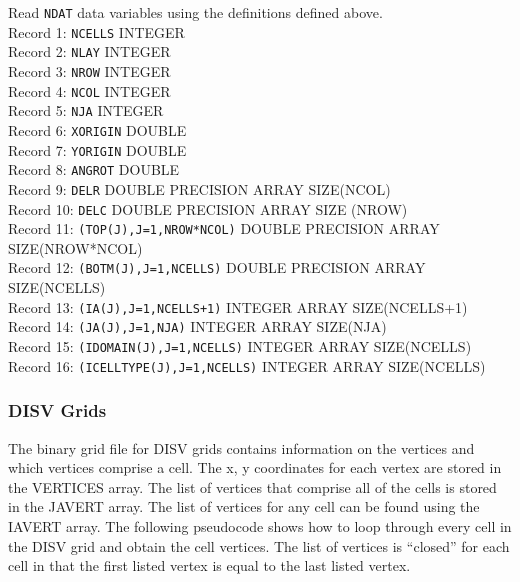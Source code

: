 \vspace{5mm}
\noindent Read \texttt{NDAT} data variables using the definitions defined above. \\
\noindent Record 1: \texttt{NCELLS} {\color{red} \footnotesize{INTEGER}} \\
\noindent Record 2: \texttt{NLAY} {\color{red} \footnotesize{INTEGER}} \\
\noindent Record 3: \texttt{NROW} {\color{red} \footnotesize{INTEGER}} \\
\noindent Record 4: \texttt{NCOL} {\color{red} \footnotesize{INTEGER}} \\
\noindent Record 5: \texttt{NJA} {\color{red} \footnotesize{INTEGER}} \\
\noindent Record 6: \texttt{XORIGIN} {\color{red} \footnotesize{DOUBLE}} \\
\noindent Record 7: \texttt{YORIGIN} {\color{red} \footnotesize{DOUBLE}} \\
\noindent Record 8: \texttt{ANGROT} {\color{red} \footnotesize{DOUBLE}} \\
\noindent Record 9: \texttt{DELR} {\color{red} \footnotesize{DOUBLE PRECISION ARRAY SIZE(NCOL)}} \\
\noindent Record 10: \texttt{DELC} {\color{red} \footnotesize{DOUBLE PRECISION ARRAY SIZE (NROW)}} \\
\noindent Record 11: \texttt{(TOP(J),J=1,NROW*NCOL)} {\color{red} \footnotesize{DOUBLE PRECISION ARRAY SIZE(NROW*NCOL)}} \\
\noindent Record 12: \texttt{(BOTM(J),J=1,NCELLS)} {\color{red} \footnotesize{DOUBLE PRECISION ARRAY SIZE(NCELLS)}} \\
\noindent Record 13: \texttt{(IA(J),J=1,NCELLS+1)} {\color{red} \footnotesize{INTEGER ARRAY SIZE(NCELLS+1)}} \\
\noindent Record 14: \texttt{(JA(J),J=1,NJA)} {\color{red} \footnotesize{INTEGER ARRAY SIZE(NJA)}} \\
\noindent Record 15: \texttt{(IDOMAIN(J),J=1,NCELLS)} {\color{red} \footnotesize{INTEGER ARRAY SIZE(NCELLS)}} \\
\noindent Record 16: \texttt{(ICELLTYPE(J),J=1,NCELLS)} {\color{red} \footnotesize{INTEGER ARRAY SIZE(NCELLS)}} \\

\newpage
\subsubsection{DISV Grids}

The binary grid file for DISV grids contains information on the vertices and which vertices comprise a cell.  The x, y coordinates for each vertex are stored in the VERTICES array.  The list of vertices that comprise all of the cells is stored in the JAVERT array.  The list of vertices for any cell can be found using the IAVERT array.  The following pseudocode shows how to loop through every cell in the DISV grid and obtain the cell vertices.  The list of vertices is ``closed'' for each cell in that the first listed vertex is equal to the last listed vertex.  

